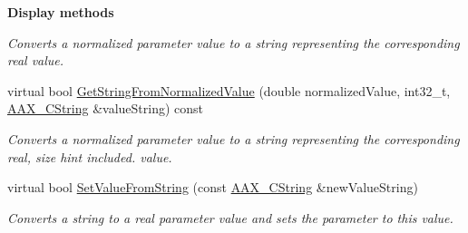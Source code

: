 \begin{Indent}{\bf Display methods}
\begin{DoxyCompactItemize}
\begin{DoxyCompactList}\small\item\em Converts a normalized parameter value to a string representing the corresponding real value. \end{DoxyCompactList}\item 
virtual bool \hyperlink{a00040_a6214a4695955aaca731e3ec277db2d21}{Get\+String\+From\+Normalized\+Value} (double normalized\+Value, int32\+\_\+t, \hyperlink{a00042}{A\+A\+X\+\_\+\+C\+String} \&value\+String) const 
\begin{DoxyCompactList}\small\item\em Converts a normalized parameter value to a string representing the corresponding real, size hint included. value. \end{DoxyCompactList}\item 
virtual bool \hyperlink{a00040_a4225fdcddd6b4b122c4bfa49d0b3b214}{Set\+Value\+From\+String} (const \hyperlink{a00042}{A\+A\+X\+\_\+\+C\+String} \&new\+Value\+String)
\begin{DoxyCompactList}\small\item\em Converts a string to a real parameter value and sets the parameter to this value. \end{DoxyCompactList}\end{DoxyCompactItemize}
\end{Indent}
